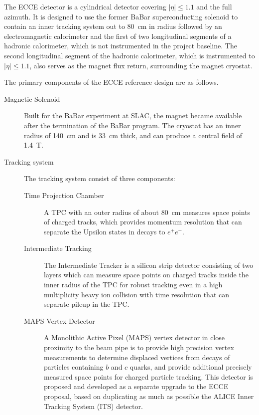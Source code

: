 The ECCE detector is a cylindrical detector covering
$\left|\eta\right| \leq 1.1$ and the full azimuth.  It is designed to use
the former BaBar superconducting solenoid to contain
an inner tracking system out to 80~cm in radius followed by an
electromagnetic calorimeter and the first of two longitudinal segments of
a hadronic calorimeter, which is not instrumented in the project baseline.  The second
longitudinal segment of the hadronic calorimeter, which is instrumented to
$|\eta| \leq 1.1$, also serves as
the magnet flux return, surrounding the magnet cryostat.


The primary components of the ECCE reference design are as follows.

\begin{description}

\item[Magnetic Solenoid]  Built for the BaBar experiment at
  SLAC, the magnet became available after the termination of the BaBar
  program.  The cryostat has an inner radius of 140~cm and is 33~cm
  thick, and can produce a central field of 1.4~T.

\item[Tracking system] The tracking system consist of three components:

\begin{description}

\item[Time Projection Chamber] A TPC with an outer radius of about 80~cm
measures space points of charged tracks, which provides momentum resolution that can
separate the Upsilon states in decays to $e^+e^-$.

\item[Intermediate Tracking] The Intermediate Tracker is a silicon strip
detector consisting of two layers which can measure space points
on charged tracks inside the inner radius of the TPC for robust tracking
even in a high multiplicity heavy ion collision with time resolution that
can separate pileup in the TPC.


\item[MAPS Vertex Detector] A Monolithic Active Pixel (MAPS) vertex
detector in close proximity to the beam pipe is to provide high precision
vertex measurements to determine displaced vertices from decays
of particles containing $b$ and $c$ quarks, and provide additional precisely
measured space points for charged particle tracking.  This detector is
proposed and developed as a separate upgrade to the ECCE proposal,
based on duplicating as much as possible the ALICE Inner Tracking System (ITS)
detector.


\end{description}
\end{description}
